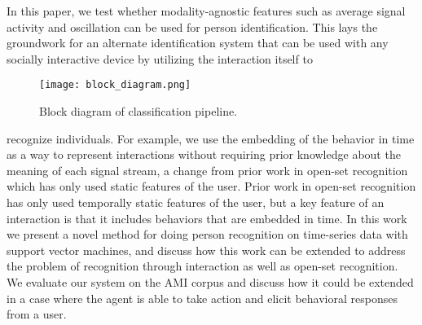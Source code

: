 \documentclass[conference]{IEEEtran}
\newcommand{\elaine}[1]{{\textcolor[rgb]{0.1,0.4,0.6}{[ESS: {\it #1}]}}}
\begin{document}
In this paper, we test whether modality-agnostic features such as average signal activity and oscillation can be used for person identification. This lays the groundwork for an alternate identification system that can be used with any socially interactive device by utilizing the interaction itself to

\begin{figure}[h]
    \centering
    \texttt{[image: block\_diagram.png]}
    \caption{Block diagram of classification pipeline.}
    \label{block_diagram}
\end{figure}

recognize individuals. For example, we use the embedding of the behavior in time as a way to represent interactions without requiring prior knowledge about the meaning of each signal stream, a change from prior work in open-set recognition which has only used static features of the user. Prior work in open-set recognition has only used temporally static features of the user, but a key feature of an interaction is that it includes behaviors that are embedded in time. In this work we present a novel method for doing person recognition on time-series data with support vector machines, and discuss how this work can be extended to address the problem of recognition through interaction as well as open-set recognition. We evaluate our system on the AMI corpus \cite{kilgour_ami_nodate} and discuss how it could be extended in a case where the agent is able to take action and elicit behavioral responses from a user. 


\end{document}
